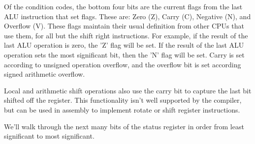 \documentclass{gqtekspec}
\begin{document}
Of the condition codes, the bottom four bits are the current flags from the
last ALU instruction that set flags.  These are:
		Zero (Z),
		Carry (C),
		Negative (N),
		and Overflow (V).
These flags maintain their usual definition from other CPUs that use them, for
all but the shift right instructions.  For example, if the result of the last
ALU operation is zero, the 'Z' flag will be set.  If the result of the last
ALU operation sets the most significant bit, then the 'N' flag will be set.
Carry is set according to unsigned operation overflow, and the overflow bit
is set according signed arithmetic overflow.

Local and arithmetic shift operations also use the carry bit to capture the
last bit shifted off the register.  This functionality isn't well supported
by the compiler, but can be used in assembly to implement rotate or shift
register instructions.

We'll walk through the next many bits of the status register in order from
least significant to most significant.
\end{document}
